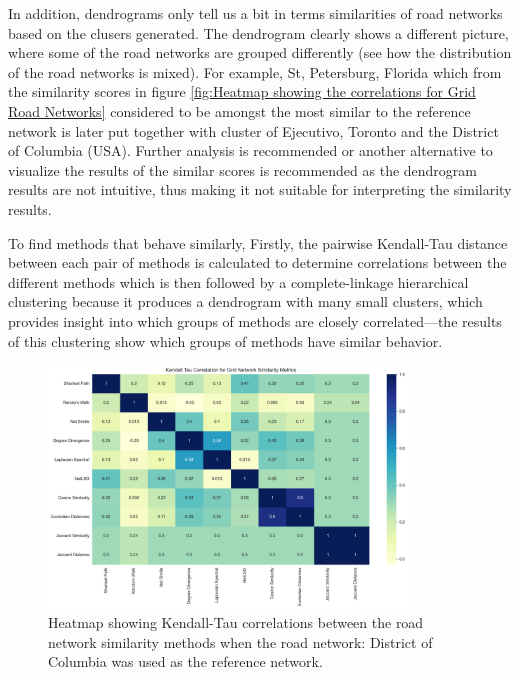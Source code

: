 In addition, dendrograms only tell us a bit in terms similarities of road networks based on the clusers generated. The dendrogram clearly shows a different picture, where some of the road networks are grouped differently (see how the distribution of the road networks is mixed). For example, St, Petersburg, Florida which from the similarity scores in figure \ref{fig:Heatmap showing the correlations for Grid Road Networks} considered to be amongst the most similar to the reference network is later put together with cluster of Ejecutivo, Toronto and the District of Columbia (USA). Further analysis is recommended or another alternative to visualize the results of the similar scores is recommended as the dendrogram results are not intuitive, thus making it not suitable for interpreting the similarity results.

To find methods that behave similarly, Firstly, the pairwise Kendall-Tau distance between each pair of methods is calculated to determine correlations between the different methods which is then followed by a complete-linkage hierarchical clustering because it produces a dendrogram with many small clusters, which provides insight into which groups of methods are closely correlated—the results of this clustering show which groups of methods have similar behavior. 

\begin{figure}[!ht]
\centering
\includegraphics[width=0.85\textwidth,center]{picture/Grid/grid2.png}
\caption[Heatmap showing Kendall-Tau correlations between the road network similarity methods for Grid Road Networks]{Heatmap showing Kendall-Tau correlations between the road network similarity methods when the road network: District of Columbia was used as the reference network.}
\label{fig:network ranking}
\end{figure}


